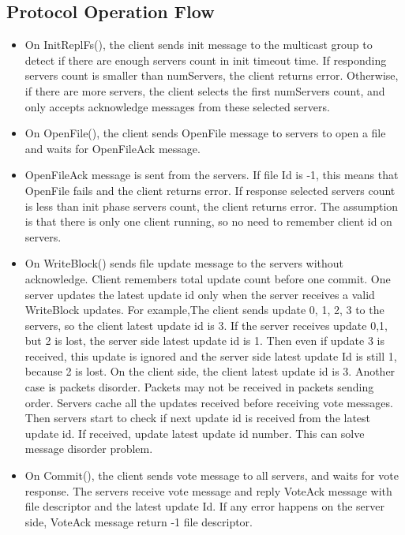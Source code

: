 \documentclass[12pt,fleqn]{article}
\begin{document}
\subsection{Protocol Operation Flow}
\begin{itemize}
	\item On InitReplFs(), the client sends init message to the multicast group to detect if there are enough servers count in init timeout time. If responding servers count is smaller than numServers, the client returns error. Otherwise, if there are more servers, the client selects the first numServers count, and only accepts acknowledge messages from these selected servers.
	\item On OpenFile(), the client sends OpenFile message to servers to open a file and waits for OpenFileAck message.
	\item OpenFileAck message is sent from the servers. If file Id is -1, this means that OpenFile fails and the client returns error. If response selected servers count is less than init phase servers count, the client returns error. The assumption is that there is only one client running, so no need to remember client id on servers.
	\item On WriteBlock() sends file update message to the servers without acknowledge. Client remembers total update count before one commit. One server updates the latest update id only when the server receives a valid WriteBlock updates. For example,The client sends update 0, 1, 2, 3 to the servers, so the client latest update id is 3. If the server receives update 0,1, but 2 is lost, the server side latest update id is 1. Then even if update 3 is received, this update is ignored and the server side latest update Id is still 1, because 2 is lost. On the client side, the client latest update id is 3. Another case is packets disorder. Packets may not be received in packets sending order. Servers cache all the updates received before receiving vote messages. Then servers start to check if next update id is received from the latest update id. If received, update latest update id number. This can solve message disorder problem.
		\item On Commit(), the client sends vote message to all servers, and waits for vote response. The servers receive vote message and reply VoteAck message with file descriptor and the latest update Id. If any error happens on the server side, VoteAck message return -1 file descriptor.

\end{itemize}
\end{document}
